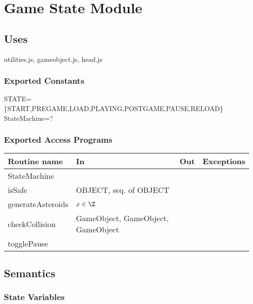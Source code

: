 \documentclass[12pt]{article}
\begin{document}

\newpage

\section*{Game State Module}

\subsection*{Uses}

utilities.js, gameobject.js, head.js\\

\subsubsection*{Exported Constants}

STATE=\{START,PREGAME,LOAD,PLAYING,POSTGAME,PAUSE,RELOAD\}\\
StateMachine=?\\

\subsubsection*{Exported Access Programs}

\begin{tabular}{| l | l | l | l |}
    \hline
    \textbf{Routine name} & \textbf{In} & \textbf{Out} & \textbf{Exceptions}\\
    \hline
    StateMachine &  & ~ & ~\\
    \hline
    isSafe & OBJECT, seq. of OBJECT & ~ & ~\\
    \hline
    generateAsteroids & $x \in \Z$ & ~ & ~ \\
    \hline
    checkCollision & GameObject, GameObject, GameObject & ~ & ~ \\
    \hline
    togglePause & ~ & ~ & ~ \\
    \hline
\end{tabular}

\subsection* {Semantics}

\subsubsection* {State Variables}
\end{document}
